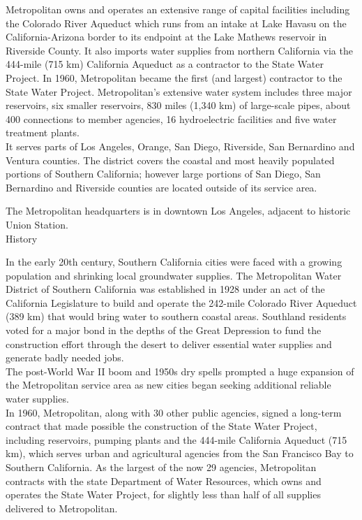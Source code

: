 \documentclass{article}
\begin{document}
Metropolitan owns and operates an extensive range of capital facilities including the Colorado River Aqueduct which runs from an intake at Lake Havasu on the California-Arizona border to its endpoint at the Lake Mathews reservoir in Riverside County. It also imports water supplies from northern California via the 444-mile (715 km) California Aqueduct as a contractor to the State Water Project. In 1960, Metropolitan became the first (and largest) contractor to the State Water Project. Metropolitan's extensive water system includes three major reservoirs, six smaller reservoirs, 830 miles (1,340 km) of large-scale pipes, about 400 connections to member agencies, 16 hydroelectric facilities and five water treatment plants.\\

It serves parts of Los Angeles, Orange, San Diego, Riverside, San Bernardino and Ventura counties. The district covers the coastal and most heavily populated portions of Southern California; however large portions of San Diego, San Bernardino and Riverside counties are located outside of its service area.

The Metropolitan headquarters is in downtown Los Angeles, adjacent to historic Union Station.\\

History


In the early 20th century, Southern California cities were faced with a growing population and shrinking local groundwater supplies. The Metropolitan Water District of Southern California was established in 1928 under an act of the California Legislature to build and operate the 242-mile Colorado River Aqueduct (389 km) that would bring water to southern coastal areas. Southland residents voted for a major bond in the depths of the Great Depression to fund the construction effort through the desert to deliver essential water supplies and generate badly needed jobs.\\

The post-World War II boom and 1950s dry spells prompted a huge expansion of the Metropolitan service area as new cities began seeking additional reliable water supplies.\\

In 1960, Metropolitan, along with 30 other public agencies, signed a long-term contract that made possible the construction of the State Water Project, including reservoirs, pumping plants and the 444-mile California Aqueduct (715 km), which serves urban and agricultural agencies from the San Francisco Bay to Southern California. As the largest of the now 29 agencies, Metropolitan contracts with the state Department of Water Resources, which owns and operates the State Water Project, for slightly less than half of all supplies delivered to Metropolitan.\\
\end{document}
